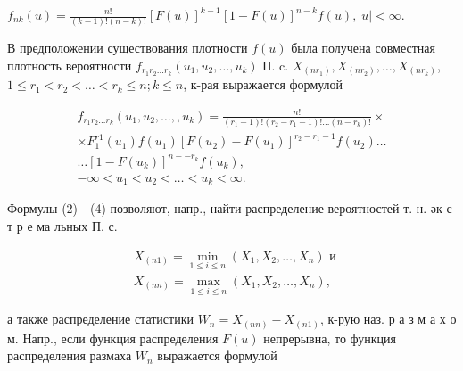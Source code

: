 \documentclass[10pt]{article}
\begin{document}
$f_{n k}(u)=\frac{n !}{(k-1) !(n-k) !}[F(u)]^{k-1}[1-F(u)]^{n-k} f(u),|u|<\infty$.



В предположении существования плотности $f(u)$ была получена совместная плотность вероятности $f_{r_{1} r_{2} \ldots r_{k}}\left(u_{1}, u_{2}, \ldots, u_{k}\right)$ П. c. $X_{\left(n r_{1}\right)}, X_{\left(n r_{2}\right)}, \ldots, X_{\left(n r_{k}\right)}$, $1 \leqslant r_{1}<r_{2}<\ldots<r_{k} \leqslant n ; k \leqslant n$, к-рая выражается формулой



\[

\begin{gathered}

f_{r_{1} r_{2} \ldots r_{k}}\left(u_{1}, u_{2}, \ldots,, u_{k}\right)=\frac{n !}{\left(r_{1}-1\right) !\left(r_{2}-r_{1}-1\right) ! \ldots\left(n-r_{k}\right) !} \times \\

\times F_{1}^{r 1}\left(u_{1}\right) f\left(u_{1}\right)\left[F\left(u_{2}\right)-F\left(u_{1}\right)\right]^{r_{2}-r_{1}-1} f\left(u_{2}\right) \ldots \\

\ldots\left[1-F\left(u_{k}\right)\right]^{n--r_{k}} f\left(u_{k}\right), \\

-\infty<u_{1}<u_{2}<\ldots<u_{k}<\infty .

\end{gathered}

\]



Формулы (2) - (4) позволяют, напр., найти распределение вероятностей т. н. әк с т р е ма льных П. с.



\[

\begin{aligned}

& X_{(n 1)}=\min _{1 \leqslant i \leqslant n}\left(X_{1}, X_{2}, \ldots, X_{n}\right) \text { и } \\

& X_{(n n)}=\max _{1 \leqslant i \leqslant n}\left(X_{1}, X_{2}, \ldots, X_{n}\right),

\end{aligned}

\]



а также распределение статистики $W_{n}=X_{(n n)}-X_{(n 1)}$, к-рую наз. р а з м а х о м. Напр., если функция распределения $F(u)$ непрерывна, то функция распределения размаха $W_{n}$ выражается формулой
\end{document}
